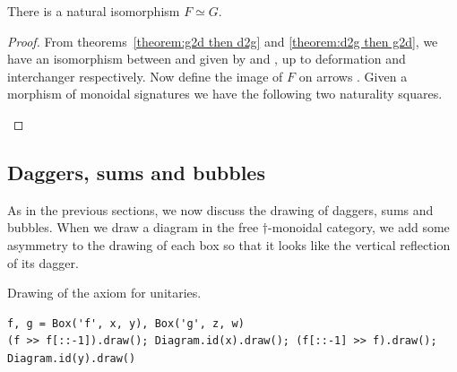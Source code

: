 \begin{theorem}\label{theorem:nat-iso}
There is a natural isomorphism $F \simeq G$.
\end{theorem}

\begin{proof}
From theorems~\ref{theorem:g2d then d2g} and \ref{theorem:d2g then g2d}, we have an isomorphism between  and  given by  and , up to deformation and interchanger respectively.
Now define the image of $F$ on arrows .
Given a morphism of monoidal signatures  we have the following two naturality squares.
\begin{center}
    \qquad {} \qquad
\end{center}
\end{proof}

\subsection{Daggers, sums and bubbles}

As in the previous sections, we now discuss the drawing of daggers, sums and bubbles.
When we draw a diagram in the free $\dagger$-monoidal category, we add some asymmetry to the drawing of each box so that it looks like the vertical reflection of its dagger.

\begin{example}
{\normalfont Drawing of the axiom for unitaries.}

\begin{verbatim}
f, g = Box('f', x, y), Box('g', z, w)
(f >> f[::-1]).draw(); Diagram.id(x).draw(); (f[::-1] >> f).draw(); Diagram.id(y).draw()
\end{verbatim}

\begin{center}
 \hspace{100pt}
\end{center}
\end{example}


